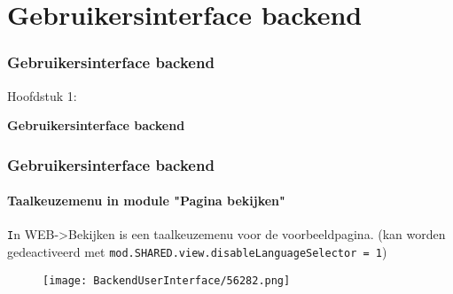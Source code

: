 %

\section{Gebruikersinterface backend}
\begin{frame}[fragile]
	\frametitle{Gebruikersinterface backend}

	\begin{center}\huge{Hoofdstuk 1:}\end{center}
	\begin{center}\huge{\color{typo3darkgrey}\textbf{Gebruikersinterface backend}}\end{center}

\end{frame}

\begin{frame}[fragile]
	\frametitle{Gebruikersinterface backend}
	\framesubtitle{Taalkeuzemenu in module "Pagina bekijken"}


	\texttt In {WEB->Bekijken} is een taalkeuzemenu voor de voorbeeldpagina.\newline
	\smaller
		(kan worden gedeactiveerd met \texttt{mod.SHARED.view.disableLanguageSelector = 1})
	\normalsize

	\begin{figure}
		\texttt{[image: BackendUserInterface/56282.png]}
	\end{figure}

\end{frame}

